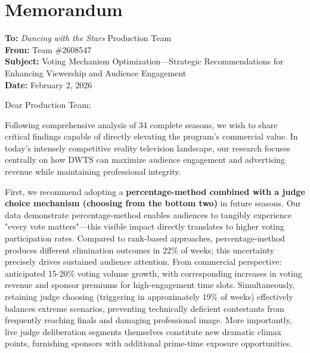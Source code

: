 
\section{Memorandum}

\noindent\textbf{To:} \textit{Dancing with the Stars} Production Team\\
\textbf{From:} Team \#2608547\\
\textbf{Subject:} Voting Mechanism Optimization---Strategic Recommendations for Enhancing Viewership and Audience Engagement\\
\textbf{Date:} February 2, 2026

\vspace{0.5em}

\noindent Dear Production Team:

Following comprehensive analysis of 34 complete seasons, we wish to share critical findings capable of directly elevating the program's commercial value. In today's intensely competitive reality television landscape, our research focuses centrally on how DWTS can maximize audience engagement and advertising revenue while maintaining professional integrity.

First, we recommend adopting a \textbf{percentage-method combined with a judge choice mechanism (choosing from the bottom two)} in future seasons. Our data demonstrate percentage-method enables audiences to tangibly experience "every vote matters"---this visible impact directly translates to higher voting participation rates. Compared to rank-based approaches, percentage-method produces different elimination outcomes in 22\% of weeks; this uncertainty precisely drives sustained audience attention. From commercial perspective: anticipated 15-20\% voting volume growth, with corresponding increases in voting revenue and sponsor premiums for high-engagement time slots. Simultaneously, retaining judge choosing (triggering in approximately 19\% of weeks) effectively balances extreme scenarios, preventing technically deficient contestants from frequently reaching finals and damaging professional image. More importantly, live judge deliberation segments themselves constitute new dramatic climax points, furnishing sponsors with additional prime-time exposure opportunities.

